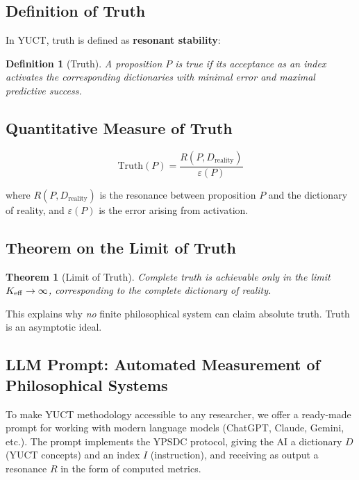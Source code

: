 \documentclass[12pt,a4paper]{article}
\newcommand{\eps}{\varepsilon}
\newtheorem{theorem}{Theorem}[section]
\newtheorem{definition}{Definition}[section]
\begin{document}
	\subsection{Definition of Truth}
	
	In YUCT, truth is defined as \textbf{resonant stability}:
	
	\begin{definition}[Truth]
		A proposition \(P\) is true if its acceptance as an index activates the corresponding dictionaries with minimal error and maximal predictive success.
	\end{definition}
	
	\subsection{Quantitative Measure of Truth}
	
	\begin{equation}
		\text{Truth}(P) = \frac{R(P, D_{\text{reality}})}{\eps(P)}
	\end{equation}
	
	where \(R(P, D_{\text{reality}})\) is the resonance between proposition \(P\) and the dictionary of reality, and \(\eps(P)\) is the error arising from activation.
	
	\subsection{Theorem on the Limit of Truth}
	
	\begin{theorem}[Limit of Truth]
		Complete truth is achievable only in the limit \(\Keff \to \infty\), corresponding to the complete dictionary of reality.
	\end{theorem}
	
	This explains why \emph{no} finite philosophical system can claim absolute truth. Truth is an asymptotic ideal.
	
	\subsection{LLM Prompt: Automated Measurement of Philosophical Systems}
	\label{sec:llm-prompt}
	
	To make YUCT methodology accessible to any researcher, we offer a ready-made prompt for working with modern language models (ChatGPT, Claude, Gemini, etc.). The prompt implements the YPSDC protocol, giving the AI a dictionary \(D\) (YUCT concepts) and an index \(I\) (instruction), and receiving as output a resonance \(R\) in the form of computed metrics.
	
\end{document}
